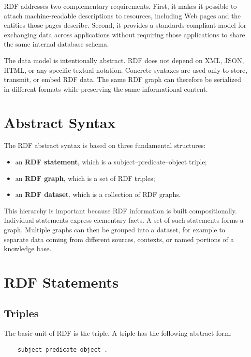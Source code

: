 \documentclass{scrbook}
\begin{document}
	RDF addresses two complementary requirements. First, it makes it possible to attach machine-readable descriptions to resources, including Web pages and the entities those pages describe. Second, it provides a standards-compliant model for exchanging data across applications without requiring those applications to share the same internal database schema.
	
	The data model is intentionally abstract. RDF does not depend on XML, JSON, HTML, or any specific textual notation. Concrete syntaxes are used only to store, transmit, or embed RDF data. The same RDF graph can therefore be serialized in different formats while preserving the same informational content.
	
	\section{Abstract Syntax}
	
	The RDF abstract syntax is based on three fundamental structures:
	
	\begin{itemize}
		\item an \textbf{RDF statement}, which is a subject--predicate--object triple;
		\item an \textbf{RDF graph}, which is a set of RDF triples;
		\item an \textbf{RDF dataset}, which is a collection of RDF graphs.
	\end{itemize}
	
	This hierarchy is important because RDF information is built compositionally. Individual statements express elementary facts. A set of such statements forms a graph. Multiple graphs can then be grouped into a dataset, for example to separate data coming from different sources, contexts, or named portions of a knowledge base.
	
	\section{RDF Statements}
	
	\subsection{Triples}
	
	The basic unit of RDF is the triple. A triple has the following abstract form:
	
	\begin{lstlisting}
	subject predicate object .
	\end{lstlisting}
	
\end{document}
